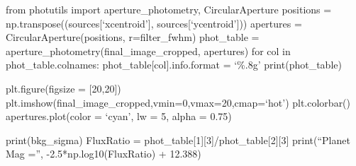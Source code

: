 \documentclass[11pt]{article}
\makeatletter
\newcommand{\boxspacing}{\kern\kvtcb@left@rule\kern\kvtcb@boxsep}
\newcommand{\prompt}[4]{
        {\ttfamily\llap{{\color{#2}[#3]:\hspace{3pt}#4}}\vspace{-\baselineskip}}
    }
\makeatother
\begin{document}
from photutils import aperture\_photometry, CircularAperture positions =
np.transpose((sources{[}`xcentroid'{]}, sources{[}`ycentroid'{]}))
apertures = CircularAperture(positions, r=filter\_fwhm) phot\_table =
aperture\_photometry(final\_image\_cropped, apertures) for col in
phot\_table.colnames: phot\_table{[}col{]}.info.format = `\%.8g'
print(phot\_table)

plt.figure(figsize = {[}20,20{]})
plt.imshow(final\_image\_cropped,vmin=0,vmax=20,cmap=`hot')
plt.colorbar() apertures.plot(color = `cyan', lw = 5, alpha = 0.75)

    print(bkg\_sigma) FluxRatio =
phot\_table{[}1{]}{[}3{]}/phot\_table{[}2{]}{[}3{]} print(``Planet Mag
='', -2.5*np.log10(FluxRatio) + 12.388)

    \begin{tcolorbox}[breakable, size=fbox, boxrule=1pt, pad at break*=1mm,colback=cellbackground, colframe=cellborder]
\prompt{In}{incolor}{ }{\boxspacing}
\begin{Verbatim}[commandchars=\\\{\}]

\end{Verbatim}
\end{tcolorbox}


    
    
    
\end{document}
